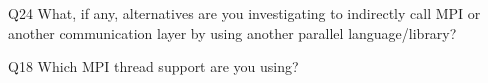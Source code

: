\begin{description}%
\item{Q24} What, if any, alternatives are you investigating to indirectly call MPI or another communication layer by using another parallel language/library?%
\item{Q18} Which MPI thread support are you using?%
\end{description}%
